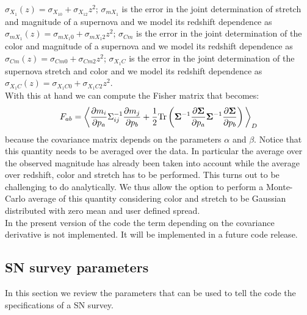 \documentclass[prd,nofootinbib,showpacs]{revtex4}
\begin{document}
$\sigma_{X_1}(z) = \sigma_{X_10} + \sigma_{X_12}z^2$; $\sigma_{mX_1}$ is the error in the joint determination of stretch and magnitude of a supernova and we model its redshift dependence as $\sigma_{mX_1}(z) = \sigma_{mX_1 0} + \sigma_{mX_1 2}z^2$; $\sigma_{Cm}$ is the error in the joint determination of the color and magnitude of a supernova and we model its redshift dependence as $\sigma_{Cm}(z) = \sigma_{Cm 0} + \sigma_{Cm 2}z^2$; 
$\sigma_{X_1C}$ is the error in the joint determination of the supernova stretch and color and we model its redshift dependence as $\sigma_{X_1C}(z) = \sigma_{X_1C 0} + \sigma_{X_1C 2}z^2$. \\
With this at hand we can compute the Fisher matrix that becomes:
%
\begin{align}
F_{ab} = \bigg\langle \frac{\partial m_i}{\partial p_a} \Sigma^{-1}_{ij} \frac{\partial m_j}{\partial p_b} +\frac{1}{2}{\rm Tr} \left( {\bf \Sigma}^{-1} \frac{\partial {\bf \Sigma}}{\partial p_a} {\bf \Sigma}^{-1} \frac{\partial {\bf \Sigma}}{\partial p_b} \right) \bigg\rangle_{D}
\end{align}
%
because the covariance matrix depends on the parameters $\alpha$ and $\beta$. Notice that this quantity needs to be averaged over the data. In particular the average over the observed magnitude has already been taken into account while the average over redshift, color and stretch has to be performed.	This turns out to be challenging to do analytically. We thus allow the option to perform a Monte-Carlo average of this quantity considering color and stretch to be Gaussian distributed with zero mean and user defined spread. \\
In the present version of the code the term depending on the covariance derivative is not implemented. It will be implemented in a future code release.

%
\subsection{SN survey parameters}
%
In this section we review the parameters that can be used to tell the code the specifications of a SN survey.
\end{document}
